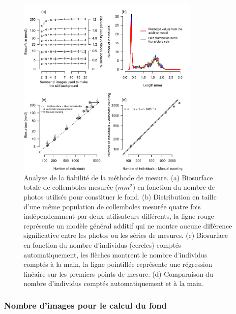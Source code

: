 \begin{figure}[!ht]
\begin{center}
\includegraphics[width=0.80\textwidth]{1_CorpsDeThese/Methodo/6_Plugin_multiP}
\caption[ Analyse de la
fiabilité]{Analyse de la fiabilité de la méthode de mesure. (a) Biosurface
totale de collemboles mesurée ($mm^2$) en fonction du nombre de photos utilisés
pour constituer le fond. (b) Distribution en taille d'une même population de
collemboles mesurée quatre fois indépendemment par deux utilisateurs
différents, la ligne rouge représente un modèle général additif qui ne montre
aucune différence significative entre les photos ou les séries de mesures. (c)
Biosurface en fonction du nombre d'individus (cercles) comptés automatiquement,
les flèches montrent le nombre d'individus comptés à la main, la ligne
pointillée représente une régression linéaire sur les premiers points de mesure.
(d) Comparaison du nombre d'individus comptés automatiquement et à la main. }
\label{fig:photofiabi}
\end{center}
\end{figure}

\subsubsection{Nombre d'images pour le calcul du fond}

